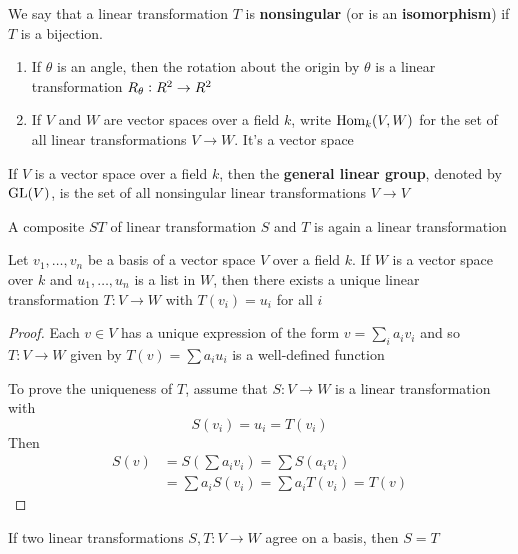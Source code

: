 \documentclass[11pt]{article}
\begin{document}
We say that a linear transformation \(T\) is \textbf{nonsingular} (or is an
\textbf{isomorphism}) if \(T\) is a bijection.

\begin{examplle}[]
\begin{enumerate}
\item If \(\theta\) is an angle, then the rotation about the origin by \(\theta\) is a linear
transformation \(R_\theta:\relax{R}^2\to \relax{R}^2\)
\item If \(V\) and \(W\) are vector spaces over a field \(k\), write
\(\operatorname{Hom}_k(V,W)\) for the set of all linear transformations \(V\to W\).
It's a vector space
\end{enumerate}
\end{examplle}

\begin{definition}[]
If \(V\) is a vector space over a field \(k\), then the \textbf{general linear group},
denoted by \(\text{GL}(V)\), is the set of all nonsingular linear transformations 
\(V\to V\)
\end{definition}

A composite \(ST\) of linear transformation \(S\) and \(T\) is again a linear
transformation 

\begin{theorem}[]
\label{thm3.92}
Let \(v_1,\dots,v_n\) be a basis of a vector space \(V\) over a field \(k\). If
\(W\) is a vector space over \(k\) and \(u_1,\dots,u_n\) is a list in \(W\), then
there exists a unique linear transformation \(T:V\to W\) with \(T(v_i)=u_i\)
for all \(i\)
\end{theorem}

\begin{proof}
Each \(v\in V\) has a unique expression of the form \(v=\sum_ia_iv_i\) and
so \(T:V\to W\) given by \(T(v)=\sum a_iu_i\) is a well-defined function

To prove the uniqueness of \(T\), assume that \(S:V\to W\) is a linear
transformation with 
\begin{equation*}
S(v_i)=u_i=T(v_i)
\end{equation*}
Then 
\begin{align*}
S(v)&=S(\sum a_iv_i)=\sum S(a_iv_i)\\
&=\sum a_iS(v_i)=\sum a_iT(v_i)=T(v)
\end{align*}
\end{proof}

\begin{corollary}[]
If two linear transformations \(S,T:V\to W\) agree on a basis, then \(S=T\)
\end{corollary}
\end{document}
